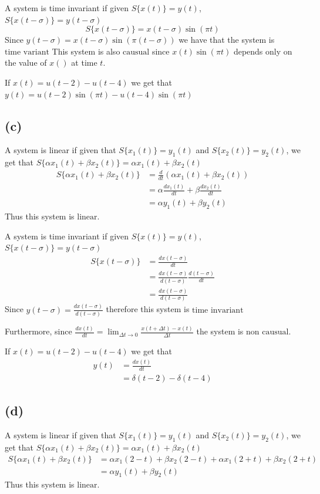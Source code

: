 \documentclass[12pt]{article}
\begin{document}
A system is time invariant if given $S\{x(t)\}=y(t)$, $S\{x(t-\sigma)\}=y(t-\sigma)$
$$S\{x(t-\sigma)\}=x(t-\sigma)\sin(\pi t)$$
Since $y(t-\sigma)=x(t-\sigma)\sin(\pi (t-\sigma))$ we have that the system is $\boxed{\text{time variant}}$
This system is also $\boxed{\text{causual}}$ since $x(t)\sin(\pi t)$ depends only on the value of $x()$ at time $t$.

If $x(t)=u(t-2)-u(t-4)$ we get that $y(t)=\boxed{u(t-2)\sin(\pi t)-u(t-4)\sin(\pi t)}$
\subsection*{(c)}
A system is linear if given that $S\{x_1(t)\}=y_1(t)$ and $S\{x_2(t)\}=y_2(t)$, we get that $S\{\alpha x_1(t)+\beta x_2(t)\}=\alpha x_1(t) +\beta x_2(t)$
\begin{align*}
S\{\alpha x_1(t)+\beta x_2(t)\}&=\frac{d}{dt}(\alpha x_1(t)+\beta x_2(t))\\
&=\alpha\frac{dx_1(t)}{dt}+\beta\frac{dx_2(t)}{dt}\\
&=\alpha y_1(t)+\beta y_2(t)
\end{align*}
Thus this system is $\boxed{\text{linear}}$.

A system is time invariant if given $S\{x(t)\}=y(t)$, $S\{x(t-\sigma)\}=y(t-\sigma)$
\begin{align*}
S\{x(t-\sigma)\}&=\frac{d x(t-\sigma)}{dt}\\
&=\frac{d x(t-\sigma)}{d (t-\sigma)}\frac{d (t-\sigma)}{dt}\\
&=\frac{d x(t-\sigma)}{d (t-\sigma)}
\end{align*}
Since $y(t-\sigma)=\frac{d x(t-\sigma)}{d (t-\sigma)}$ therefore this system is $\boxed{\text{time invariant}}$

Furthermore, since $\frac{d x(t)}{dt}=\lim_{\Delta t\to0}\frac{x(t+\Delta t)-x(t)}{\Delta t}$ the system is $\boxed{\text{non causual}}$.

If $x(t)=u(t-2)-u(t-4)$ we get that
\begin{align*}
y(t)&=\frac{d x(t)}{dt}\\
&=\boxed{\delta(t-2)-\delta(t-4)}
\end{align*}
\subsection*{(d)}
A system is linear if given that $S\{x_1(t)\}=y_1(t)$ and $S\{x_2(t)\}=y_2(t)$, we get that $S\{\alpha x_1(t)+\beta x_2(t)\}=\alpha x_1(t) +\beta x_2(t)$
\begin{align*}
S\{\alpha x_1(t)+\beta x_2(t)\}&=\alpha x_1(2-t)+\beta x_2(2-t)+\alpha x_1(2+t)+\beta x_2(2+t)\\
&=\alpha y_1(t)+\beta y_2(t)
\end{align*}
Thus this system is $\boxed{\text{linear}}$.
\end{document}
